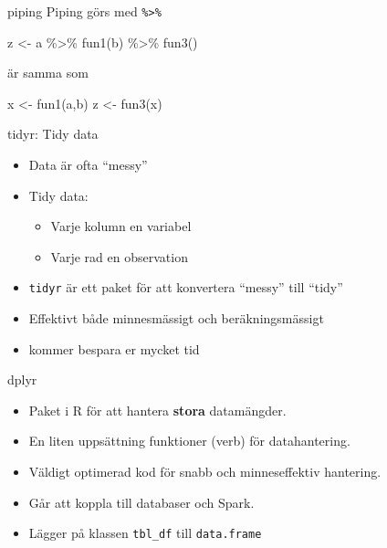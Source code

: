 \documentclass[
  11pt,
  ignorenonframetext,
  handout]{beamer}
\newenvironment{Shaded}{\begin{snugshade}}{\end{snugshade}}
\newcommand{\FunctionTok}[1]{\textcolor[rgb]{0.00,0.00,0.00}{#1}}
\newcommand{\NormalTok}[1]{#1}
\newcommand{\OtherTok}[1]{\textcolor[rgb]{0.56,0.35,0.01}{#1}}
\newcommand{\SpecialCharTok}[1]{\textcolor[rgb]{0.00,0.00,0.00}{#1}}
\providecommand{\tightlist}{%
  \setlength{\itemsep}{0pt}\setlength{\parskip}{0pt}}
\begin{document}

\begin{frame}[fragile]{piping}
\protect\hypertarget{piping}{}
Piping görs med \texttt{\%\textgreater{}\%}

\begin{Shaded}
\begin{Highlighting}[]
\NormalTok{z }\OtherTok{\textless{}{-}}\NormalTok{ a }\SpecialCharTok{\%\textgreater{}\%}
  \FunctionTok{fun1}\NormalTok{(b) }\SpecialCharTok{\%\textgreater{}\%}
  \FunctionTok{fun3}\NormalTok{()}
\end{Highlighting}
\end{Shaded}

är samma som

\begin{Shaded}
\begin{Highlighting}[]
\NormalTok{x }\OtherTok{\textless{}{-}} \FunctionTok{fun1}\NormalTok{(a,b)}
\NormalTok{z }\OtherTok{\textless{}{-}} \FunctionTok{fun3}\NormalTok{(x)}
\end{Highlighting}
\end{Shaded}
\end{frame}


\begin{frame}[fragile]{tidyr: Tidy data}
\protect\hypertarget{tidyr-tidy-data}{}
\begin{itemize}
\tightlist
\item
  Data är ofta ``messy''
\item
  Tidy data:

  \begin{itemize}
  \tightlist
  \item
    Varje kolumn en variabel
  \item
    Varje rad en observation
  \end{itemize}
\item
  \texttt{tidyr} är ett paket för att konvertera ``messy'' till ``tidy''
\item
  Effektivt både minnesmässigt och beräkningsmässigt
\item
  kommer bespara er mycket tid
\end{itemize}
\end{frame}


\begin{frame}[fragile]{dplyr}
\protect\hypertarget{dplyr}{}
\begin{itemize}
\tightlist
\item
  Paket i R för att hantera \textbf{stora} datamängder.
\item
  En liten uppsättning funktioner (verb) för datahantering.
\item
  Väldigt optimerad kod för snabb och minneseffektiv hantering.
\item
  Går att koppla till databaser och Spark.
\item
  Lägger på klassen \texttt{tbl\_df} till \texttt{data.frame}
\end{itemize}
\end{frame}
\end{document}
